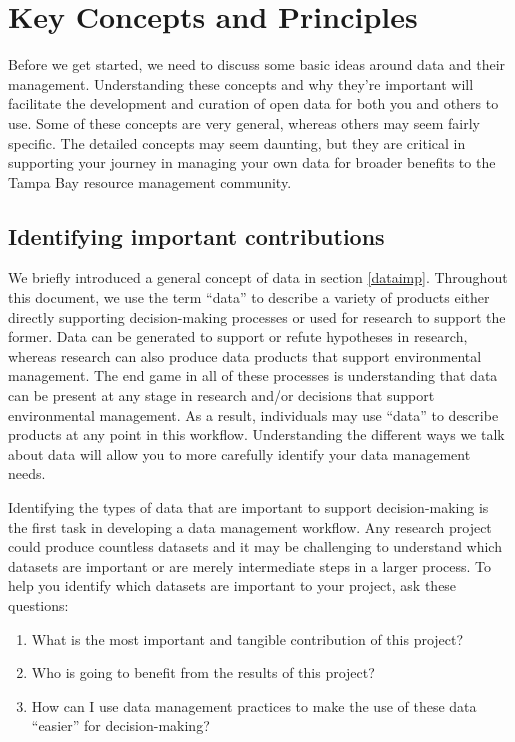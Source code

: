 \documentclass[
]{book}
\providecommand{\tightlist}{%
  \setlength{\itemsep}{0pt}\setlength{\parskip}{0pt}}
\begin{document}
\chapter{Key Concepts and Principles}\label{keys}

Before we get started, we need to discuss some basic ideas around data and their management. Understanding these concepts and why they're important will facilitate the development and curation of open data for both you and others to use. Some of these concepts are very general, whereas others may seem fairly specific. The detailed concepts may seem daunting, but they are critical in supporting your journey in managing your own data for broader benefits to the Tampa Bay resource management community.

\section{Identifying important contributions}\label{contribs}

We briefly introduced a general concept of data in section \ref{dataimp}. Throughout this document, we use the term ``data'' to describe a variety of products either directly supporting decision-making processes or used for research to support the former. Data can be generated to support or refute hypotheses in research, whereas research can also produce data products that support environmental management. The end game in all of these processes is understanding that data can be present at any stage in research and/or decisions that support environmental management. As a result, individuals may use ``data'' to describe products at any point in this workflow. Understanding the different ways we talk about data will allow you to more carefully identify your data management needs.

Identifying the types of data that are important to support decision-making is the first task in developing a data management workflow. Any research project could produce countless datasets and it may be challenging to understand which datasets are important or are merely intermediate steps in a larger process. To help you identify which datasets are important to your project, ask these questions:

\begin{enumerate}
\def\labelenumi{\arabic{enumi}.}
\tightlist
\item
  What is the most important and tangible contribution of this project?\\
\item
  Who is going to benefit from the results of this project?
\item
  How can I use data management practices to make the use of these data ``easier'' for decision-making?
\end{enumerate}
\end{document}
